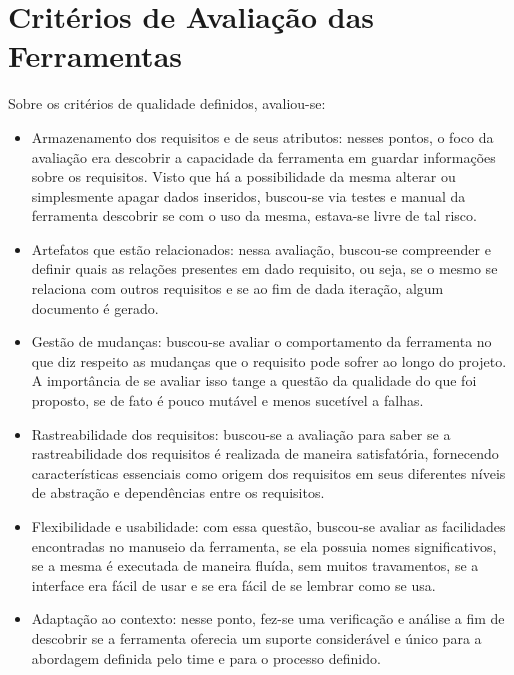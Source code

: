 \section[Critérios de Avaliação das Ferramentas]{Critérios de Avaliação das Ferramentas}
Sobre os critérios de qualidade definidos, avaliou-se:

\begin{itemize}
  \item Armazenamento dos requisitos e de seus atributos: nesses pontos, o foco da avaliação era descobrir a capacidade da ferramenta em guardar informações sobre os requisitos. Visto que há a possibilidade da mesma alterar ou simplesmente apagar dados inseridos, buscou-se via testes e manual da ferramenta descobrir se com o uso da mesma, estava-se livre de tal risco.

  \item Artefatos que estão relacionados: nessa avaliação, buscou-se compreender e definir quais as relações presentes em dado requisito, ou seja, se o mesmo se relaciona com outros requisitos e se ao fim de dada iteração, algum documento é gerado.

  \item Gestão de mudanças: buscou-se avaliar o comportamento da ferramenta no que diz respeito as mudanças que o requisito pode sofrer ao longo do projeto. A importância de se avaliar isso tange a questão da qualidade do que foi proposto, se de fato é pouco mutável e menos sucetível a falhas.

  \item Rastreabilidade dos requisitos: buscou-se a avaliação para saber se a rastreabilidade dos requisitos é realizada de maneira satisfatória, fornecendo características essenciais como origem dos requisitos em seus diferentes níveis de abstração e dependências entre os requisitos.

  \item Flexibilidade e usabilidade: com essa questão, buscou-se avaliar as facilidades encontradas no manuseio da ferramenta, se ela possuia nomes significativos, se a mesma é executada de maneira fluída, sem muitos travamentos, se a interface era fácil de usar e se era fácil de se lembrar como se usa.

  \item Adaptação ao contexto: nesse ponto, fez-se uma verificação e análise a fim de descobrir se a ferramenta oferecia um suporte considerável e 
  único para a abordagem definida pelo time e para o processo definido.
\end{itemize}

